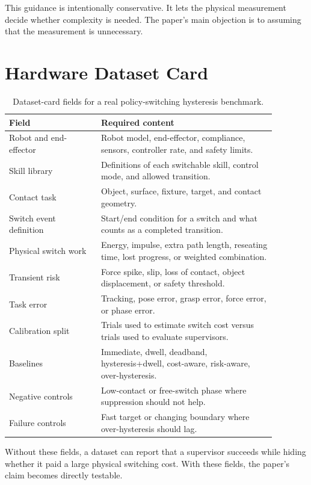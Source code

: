 \documentclass{article}
\begin{document}
This guidance is intentionally conservative.
It lets the physical measurement decide whether complexity is needed.
The paper's main objection is to assuming that the measurement is unnecessary.

\section{Hardware Dataset Card}

\begin{table}[h]
\centering
\caption{Dataset-card fields for a real policy-switching hysteresis benchmark.}
\small
\begin{tabular}{p{0.30\linewidth}p{0.58\linewidth}}
\toprule
Field & Required content \\
\midrule
Robot and end-effector & Robot model, end-effector, compliance, sensors, controller rate, and safety limits. \\
Skill library & Definitions of each switchable skill, control mode, and allowed transition. \\
Contact task & Object, surface, fixture, target, and contact geometry. \\
Switch event definition & Start/end condition for a switch and what counts as a completed transition. \\
Physical switch work & Energy, impulse, extra path length, reseating time, lost progress, or weighted combination. \\
Transient risk & Force spike, slip, loss of contact, object displacement, or safety threshold. \\
Task error & Tracking, pose error, grasp error, force error, or phase error. \\
Calibration split & Trials used to estimate switch cost versus trials used to evaluate supervisors. \\
Baselines & Immediate, dwell, deadband, hysteresis+dwell, cost-aware, risk-aware, over-hysteresis. \\
Negative controls & Low-contact or free-switch phase where suppression should not help. \\
Failure controls & Fast target or changing boundary where over-hysteresis should lag. \\
\bottomrule
\end{tabular}
\end{table}

Without these fields, a dataset can report that a supervisor succeeds while hiding whether it paid a large physical switching cost.
With these fields, the paper's claim becomes directly testable.
\end{document}
